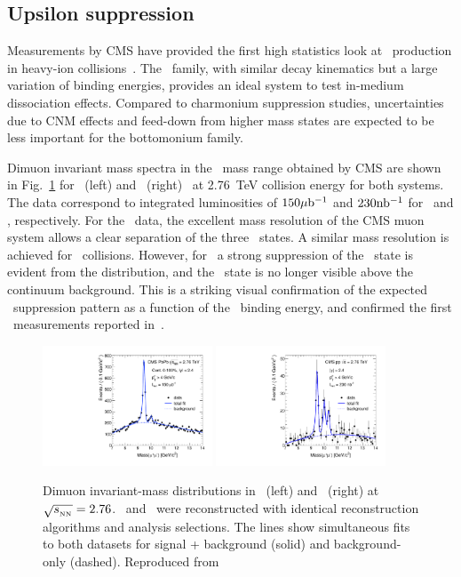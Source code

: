 \subsection{Upsilon suppression}

Measurements by CMS have provided the first high statistics look at \PgU\
production in heavy-ion collisions~\cite{CMS_Y_2010}.
The \PgU\ family, with similar decay kinematics but a large variation of binding energies,
provides an ideal system to test in-medium dissociation effects.
Compared to charmonium suppression studies, uncertainties due
to CNM effects and feed-down from higher mass states are expected to be
less important for the bottomonium family.

Dimuon invariant mass spectra in the \PgU\ mass range obtained by CMS are shown in 
Fig.~\ref{fig:GR:mass} for \PbPb\ (left) and \pp\ (right)~\cite{Chatrchyan:2012lxa}
at 2.76~TeV collision energy for both systems. 
The data correspond to integrated luminosities of $150\mathrm{\mu b^{-1}}$ and $230 \mathrm{nb^{-1}}$ for
\PbPb\ and \pp, respectively. For the \pp\ data, the excellent mass resolution of the CMS muon system
allows a clear separation of the three \PgUn\ states. A similar mass resolution is achieved 
for \PbPb\ collisions.
However, for \PbPb\ a strong suppression of the \PgUb\ state is evident from the 
distribution, and the \PgUc\ state is no longer visible above the continuum background. 
This is a striking visual confirmation of the expected
\PgU\ suppression pattern as a function of the \PgUn\ binding energy, and confirmed the 
first \PgU\ measurements reported in~\cite{CMS_Y_2010}.

\begin{figure}[t]
\begin{center}
    \includegraphics[width=0.45\textwidth]{qqbarfigures/hiFitPt4Erf}
    \includegraphics[width=0.45\textwidth]{qqbarfigures/ppFitPt4Erf}
    \caption{Dimuon invariant-mass distributions in \PbPb\ (left) and \pp\ (right)
at $\sqrt{s_{_{\rm NN}}} = 2.76$\TeV. \PbPb\ and \pp\ were reconstructed with identical
reconstruction algorithms and analysis selections. The lines show simultaneous fits to both
datasets for signal + background (solid) and background-only (dashed).
Reproduced from~\cite{Chatrchyan:2012lxa}}
\label{fig:GR:mass}
\end{center}
\end{figure}


